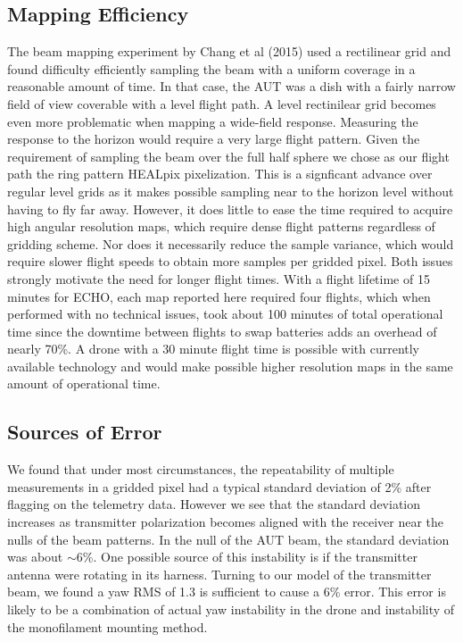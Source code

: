 \documentclass[preprint2,numberedappendix,tighten,twocolappendix]{aastex6}
\begin{document}
\subsection{Mapping Efficiency}

The beam mapping experiment by Chang et al (2015) used a rectilinear grid and found difficulty efficiently sampling the beam with a uniform coverage in a reasonable amount of time.   In that case, the AUT was a dish with a fairly narrow field of view coverable with a level flight path. A level rectinilear grid becomes even more problematic when mapping a wide-field response.  Measuring the response to the horizon would require a very large flight pattern. Given the requirement of sampling the beam over the full half sphere we chose as our flight path the ring pattern HEALpix pixelization. This is a signficant advance over regular level grids as it makes possible sampling near to the horizon level without having to fly far away. However, it does little to ease the time required to acquire high angular resolution maps, which require dense flight patterns regardless of gridding scheme. Nor does it necessarily reduce the sample variance, which would require slower flight speeds to obtain more samples per gridded pixel. Both issues strongly motivate the need for longer flight times.  With a flight lifetime of 15 minutes for ECHO, each map reported here required four flights, which when performed with no technical issues, took about 100 minutes of total operational time since the downtime between flights to swap batteries adds an overhead of nearly 70\%.  A drone with a 30 minute flight time is possible with currently available technology and would make possible higher resolution maps in the same amount of operational time.

\subsection{Sources of Error}

We found that under most circumstances, the repeatability of multiple measurements in a gridded pixel had a typical standard deviation of 2\% after flagging on the telemetry data. However we see that the standard deviation increases as transmitter polarization becomes aligned with the receiver near the nulls of the beam patterns. In the null of the AUT beam, the standard deviation was about $\sim$6\%. One possible source of this instability is if the transmitter antenna were rotating in its harness. Turning to our model of the transmitter beam, we found a yaw RMS of  1.3\arcdeg{} is sufficient to cause a 6\% error. This error is likely to be a combination of actual yaw instability in the drone and instability of the monofilament mounting method. 
\end{document}
